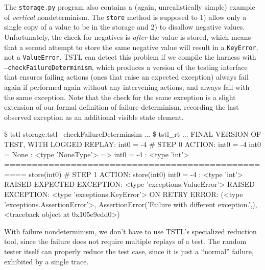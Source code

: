 The {\tt storage.py} program also contains a (again, unrealistically
simple) example of \emph{vertical} nondeterminism.  The {\tt store}
method is supposed to 1) allow only a single copy of a value to be in
the storage and 2) to disallow negative values.  Unfortunately, the
check for negatives is \emph{after} the value is stored, which means
that a second attempt to store the same negative value will result in
a {\tt KeyError}, not a {\tt ValueError}.  TSTL can detect this
problem if we compile the harness with {\tt
  --checkFailureDeterminism}, which produces a version of the testing
interface that ensures failing actions (ones that raise an expected
exception) always fail again if performed again without any
intervening actions, and always fail with the same exception.  Note
that the check for the same exception is a slight extension of our formal
definition of failure determinism, recording the last observed
exception as an additional visible state element.

{\scriptsize
\begin{code}
 \$ tstl storage.tstl --checkFailureDeterminsim
 ...
 \$ tstl\_rt
 ...
 FINAL VERSION OF TEST, WITH LOGGED REPLAY:
 int0 = -4                                   \# STEP 0
 ACTION: int0 = -4 
 int0 = None : <type 'NoneType'>
 => int0 = -4 : <type 'int'>
 ==================================================
 store(int0)                                 \# STEP 1
 ACTION: store(int0) 
 int0 = -4 : <type 'int'>
 RAISED EXPECTED EXCEPTION:
   <type 'exceptions.ValueError'> 
 RAISED EXCEPTION:
   <type 'exceptions.KeyError'>  ON RETRY
   ERROR: (<type 'exceptions.AssertionError'>,
   AssertionError('Failure with different exception.',),
 <traceback object at 0x105e9edd0>)
\end{code}
}

With failure nondeterminism, we don't have to use TSTL's specialized reduction
tool, since the failure does not require multiple replays of a test.
The random tester itself can properly reduce the test case, since it
is just a ``normal'' failure, exhibited by a single trace.
